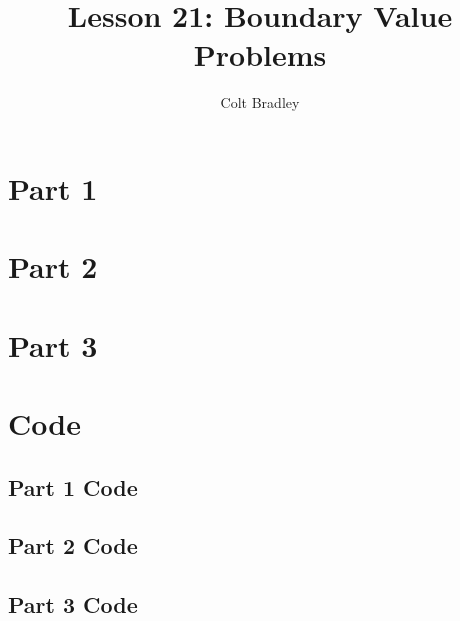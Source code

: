\documentclass[11pt]{article}
\begin{document}
\title{Lesson 21: Boundary Value Problems}
\author{Colt Bradley}
\date{}
\maketitle

\section{Part 1}

\section{Part 2}

\section{Part 3}

\section{Code}
\subsection{Part 1 Code}

\subsection{Part 2 Code}

\subsection{Part 3 Code}
\end{document}
